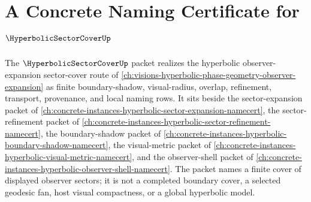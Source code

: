 \chapter{A Concrete Naming Certificate for $\HyperbolicSectorCoverUp$}
\label{ch:concrete-instances-hyperbolic-sector-cover-namecert}

The $\HyperbolicSectorCoverUp$ packet realizes the hyperbolic observer-expansion sector-cover route of \autoref{ch:visions-hyperbolic-phase-geometry-observer-expansion} as finite boundary-shadow, visual-radius, overlap, refinement, transport, provenance, and local naming rows. It sits beside the sector-expansion packet of \autoref{ch:concrete-instances-hyperbolic-sector-expansion-namecert}, the sector-refinement packet of \autoref{ch:concrete-instances-hyperbolic-sector-refinement-namecert}, the boundary-shadow packet of \autoref{ch:concrete-instances-hyperbolic-boundary-shadow-namecert}, the visual-metric packet of \autoref{ch:concrete-instances-hyperbolic-visual-metric-namecert}, and the observer-shell packet of \autoref{ch:concrete-instances-hyperbolic-observer-shell-namecert}. The packet names a finite cover of displayed observer sectors; it is not a completed boundary cover, a selected geodesic fan, host visual compactness, or a global hyperbolic model.


